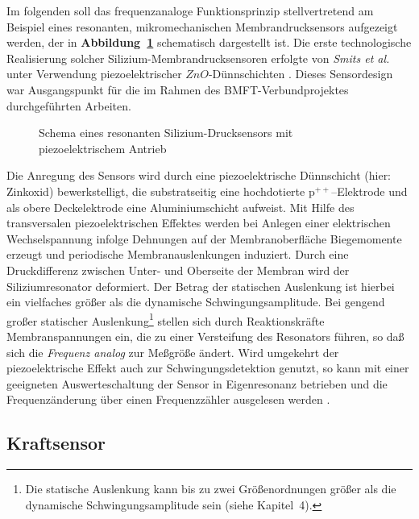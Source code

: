 Im folgenden soll das frequenzanaloge Funktionsprinzip stellvertretend
am Beispiel eines resonanten, mikromechanischen Membrandrucksensors
aufgezeigt werden, der in {\bf Abbildung~\ref{abbdrucksensor}}
schematisch dargestellt ist. Die erste technologische Realisierung
solcher Silizium-Membrandrucksensoren erfolgte von {\em Smits et al.}
unter Verwendung piezoelektrischer $ZnO$-Dünnschichten \cite{Smi83}.
Dieses Sensordesign war Ausgangspunkt für die im Rahmen des
BMFT-Verbundprojektes durchgeführten Arbeiten.
\begin{figure}[htb]
\begin{center}

\setdruckse
\end{center}
 \caption{\label{abbdrucksensor}
 Schema eines resonanten Silizium-Drucksensors mit piezoelektrischem Antrieb}
\end{figure}
Die Anregung des Sensors wird durch eine piezoelektrische Dünnschicht
(hier: Zinkoxid)
bewerkstelligt, die substratseitig eine hochdotierte p$^{++}$--Elektrode
und als obere Deckelektrode eine Aluminiumschicht aufweist.
Mit Hilfe des transversalen piezoelektrischen
Effektes werden bei Anlegen einer elektrischen Wechselspannung infolge
Dehnungen auf der Membranoberfläche Biegemomente erzeugt und perio\-dische
Membranauslenkungen induziert. Durch eine Druckdifferenz zwischen Unter-
und Oberseite der Membran wird der Siliziumresonator deformiert. Der Betrag
der statischen Auslenkung ist hierbei ein vielfaches größer als die
dynamische Schwingungsamplitude. Bei gengend großer statischer
Auslenkung\footnote{Die statische Auslenkung kann bis zu zwei
Größenordnungen größer als die dynamische Schwingungsamplitude sein
(siehe Kapitel~4).} stellen sich durch Reaktionskräfte
Membranspannungen ein, die zu einer Versteifung des Resonators führen,
so daß sich die {\em Frequenz analog} zur Meßgröße ändert. Wird
umgekehrt der piezoelektrische Effekt auch zur Schwingungsdetektion
genutzt, so kann mit einer geeigneten Auswerteschaltung der Sensor in
Eigenresonanz betrieben und die Frequenzänderung über einen Frequenzzähler
ausgelesen werden \cite{Fun93}.


\subsection{Kraftsensor}
\label{kraftsensor}

